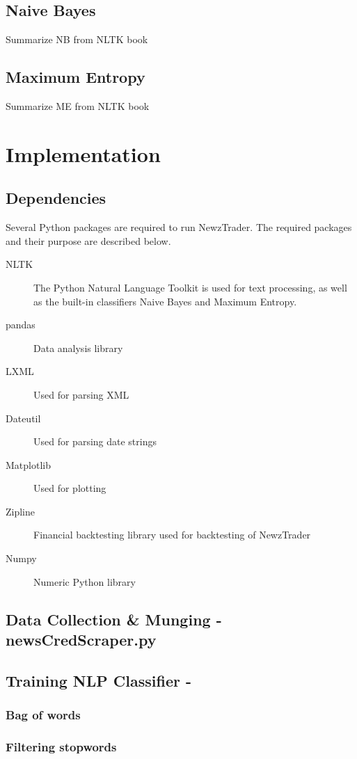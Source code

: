 \documentclass[]{article}
\begin{document}
\subsection{Naive Bayes}
Summarize NB from NLTK book
\subsection{Maximum Entropy}
Summarize ME from NLTK book

\section{Implementation}

\subsection{Dependencies}
Several Python packages are required to run NewzTrader.  The required packages and their purpose are described below.
\begin{description}
 
\item[NLTK] The Python Natural Language Toolkit is used for text processing, as well as the built-in classifiers Naive Bayes and Maximum Entropy. 

\item[pandas] Data analysis library
\item[LXML] Used for parsing XML
\item[Dateutil] Used for parsing date strings
\item[Matplotlib] Used for plotting
\item[Zipline] Financial backtesting library used for backtesting of NewzTrader
\item[Numpy] Numeric Python library

\end{description}
\subsection{Data Collection \& Munging - newsCredScraper.py}
\subsection{Training NLP Classifier - }
\subsubsection{Bag of words}
\subsubsection{Filtering stopwords}
\end{document}
